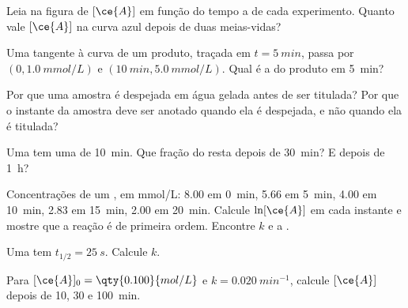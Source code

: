 \begin{exercise}[$\star$]\label{exo:g12:reaction-rates:2}
Leia na figura de $[\ce{A}]$ em função do tempo a  de cada
experimento. Quanto vale $[\ce{A}]$ na curva azul depois de duas
meias-vidas?
\end{exercise}

\begin{exercise}[$\star$]\label{exo:g12:reaction-rates:3}
Uma tangente à curva de um produto, traçada em $t = \qty{5}{min}$, passa
por $(0, \qty{1.0}{mmol/L})$ e $(\qty{10}{min}, \qty{5.0}{mmol/L})$.
Qual é a  do produto em \qty{5}{min}?
\end{exercise}

\begin{exercise}[$\star$]\label{exo:g12:reaction-rates:4}
Por que uma amostra é despejada em água gelada antes de ser titulada?
Por que o instante da amostra deve ser anotado quando ela é despejada, e
não quando ela é titulada?
\end{exercise}

\begin{exercise}[$\star$]\label{exo:g12:reaction-rates:5}
Uma  tem uma  de \qty{10}{min}. Que
fração do  resta depois de \qty{30}{min}? E depois de
\qty{1}{h}?
\end{exercise}

\begin{exercise}[$\star\star$]\label{exo:g12:reaction-rates:6}
Concentrações de um , em \si{mmol/L}: 8.00 em \qty{0}{min}, 5.66
em \qty{5}{min}, 4.00 em \qty{10}{min}, 2.83 em \qty{15}{min}, 2.00 em
\qty{20}{min}. Calcule $\ln[\ce{A}]$ em cada instante e mostre que a
reação é de primeira ordem. Encontre $k$ e a .
\end{exercise}

\begin{exercise}[$\star\star$]\label{exo:g12:reaction-rates:7}
Uma  tem $t_{1/2} = \qty{25}{s}$. Calcule $k$.
\end{exercise}

\begin{exercise}[$\star\star$]\label{exo:g12:reaction-rates:8}
Para $[\ce{A}]_0 = \qty{0.100}{mol/L}$ e $k = \qty{0.020}{min^{-1}}$,
calcule $[\ce{A}]$ depois de 10, 30 e \qty{100}{min}.
\end{exercise}

